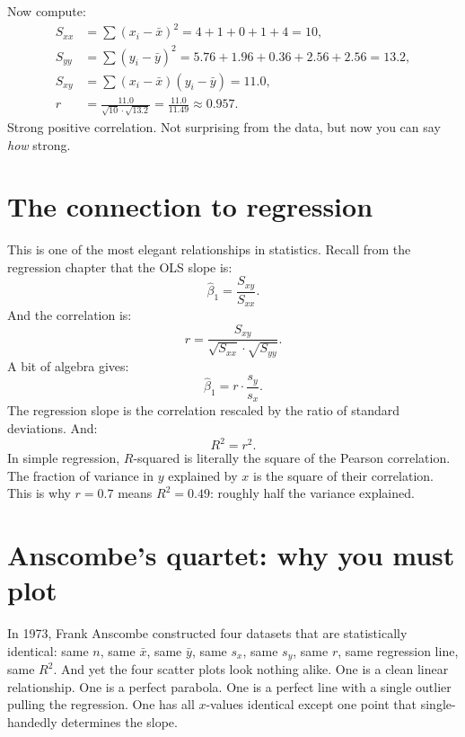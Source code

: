 Now compute:
\begin{align*}
  S_{xx} &= \sum(x_i - \bar{x})^2 = 4 + 1 + 0 + 1 + 4 = 10, \\[3pt]
  S_{yy} &= \sum(y_i - \bar{y})^2 = 5.76 + 1.96 + 0.36 + 2.56 + 2.56 = 13.2, \\[3pt]
  S_{xy} &= \sum(x_i - \bar{x})(y_i - \bar{y}) = 11.0, \\[3pt]
  r &= \frac{11.0}{\sqrt{10} \cdot \sqrt{13.2}} = \frac{11.0}{11.49} \approx 0.957.
\end{align*}
Strong positive correlation. Not surprising from the data, but now you can say \emph{how} strong.

\section{The connection to regression}

This is one of the most elegant relationships in statistics. Recall from the regression chapter that the OLS slope is:
\[
  \hat\beta_1 = \frac{S_{xy}}{S_{xx}}.
\]
And the correlation is:
\[
  r = \frac{S_{xy}}{\sqrt{S_{xx}} \cdot \sqrt{S_{yy}}}.
\]
A bit of algebra gives:
\begin{equation}
  \hat\beta_1 = r \cdot \frac{s_y}{s_x}.
  \label{eq:slope-from-r}
\end{equation}
The regression slope is the correlation rescaled by the ratio of standard deviations. And:
\begin{equation}
  R^2 = r^2.
  \label{eq:r2-from-r}
\end{equation}
In simple regression, $R$-squared is literally the square of the Pearson correlation. The fraction of variance in $y$ explained by $x$ is the square of their correlation. This is why $r = 0.7$ means $R^2 = 0.49$: roughly half the variance explained.

\section{Anscombe's quartet: why you must plot}

In 1973, Frank Anscombe constructed four datasets that are statistically identical: same $n$, same $\bar{x}$, same $\bar{y}$, same $s_x$, same $s_y$, same $r$, same regression line, same $R^2$. And yet the four scatter plots look nothing alike. One is a clean linear relationship. One is a perfect parabola. One is a perfect line with a single outlier pulling the regression. One has all $x$-values identical except one point that single-handedly determines the slope.

